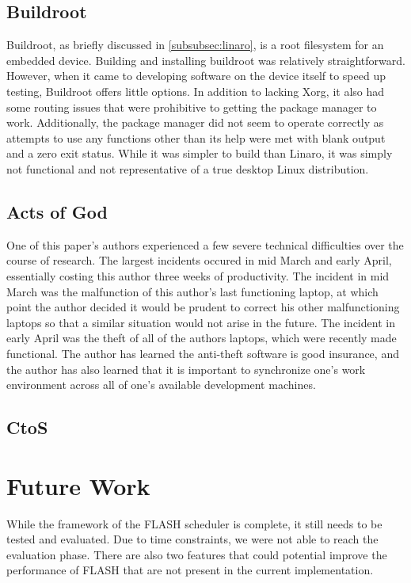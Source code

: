 \documentclass{sig-alternate-10pt}
\begin{document}
\subsection{Buildroot}
Buildroot, as briefly discussed in \ref{subsubsec:linaro}, is a root filesystem for an embedded device. Building and installing buildroot was relatively straightforward. However, when it came to developing software on the device itself to speed up testing, Buildroot offers little options. In addition to lacking Xorg, it also had some routing issues that were prohibitive to getting the package manager to work. Additionally, the package manager did not seem to operate correctly as attempts to use any functions other than its help were met with blank output and a zero exit status. While it was simpler to build than Linaro, it was simply not functional and not representative of a true desktop Linux distribution.

\subsection{Acts of God}
One of this paper's authors experienced a few severe technical difficulties over the course of research. The largest incidents occured in mid March and early April, essentially costing this author three weeks of productivity. The incident in mid March was the malfunction of this author's last functioning laptop, at which point the author decided it would be prudent to correct his other malfunctioning laptops so that a similar situation would not arise in the future. The incident in early April was the theft of all of the authors laptops, which were recently made functional. The author has learned the anti-theft software is good insurance, and the author has also learned that it is important to synchronize one's work environment across all of one's available development machines.

\subsection{CtoS}

\section{Future Work}
\label{sec:future}
While the framework of the FLASH scheduler is complete, it still needs to be tested and evaluated. Due to time constraints, we were not able to reach the evaluation phase. There are also two features that could potential improve the performance of FLASH that are not present in the current implementation.
\end{document}
